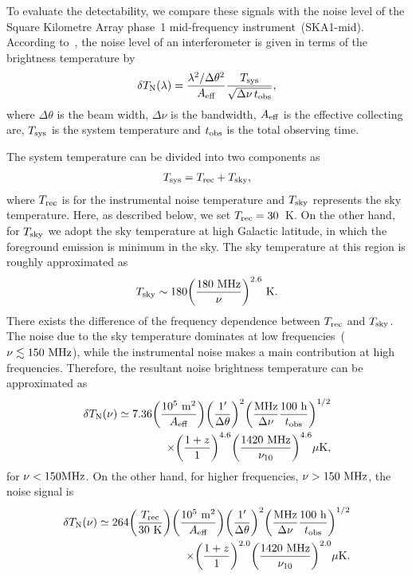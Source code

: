 \documentclass[a4paper,fleqn,usenatbib,useAMS]{mnras}
\begin{document}
To evaluate the detectability, we compare these signals with the noise level of the Square Kilometre Array phase~1 mid-frequency instrument~(SKA1-mid).
According to~\citet{Furlanetto2006}, the noise level of an
interferometer is given in terms of the brightness temperature by
\begin{align}
\delta T_{\rm{N}}(\lambda)=
 \frac{\lambda^{2}/\Delta
 \theta^{2}}{A_{\rm{eff}}}\frac{T_{\rm{sys}}}{\sqrt{\Delta \nu \,
 t_{\rm{obs}}}}, \label{eq:noise_eq}
\end{align}
where $\Delta \theta$ is the beam width, $\Delta \nu$ is the bandwidth,
$A_{\rm{eff}}$ is the effective collecting are, $T_{\rm sys}$ is the
system temperature and $t_{\rm obs}$ is the total observing time.

The system temperature can be divided into two components as
\begin{align}
T_{\rm{sys}} = T_{\rm{rec}} +T_{\rm{sky}},
\end{align}
where $T_{\rm rec}$ is for
the instrumental noise temperature and $T_{\rm{sky}}$ represents the sky temperature.
Here, as described below, we set $T_{\rm rec} =30$~K.
On the other hand, for $T_{\rm sky}$
we adopt the sky temperature at high Galactic latitude, in  which the
foreground emission is minimum in the sky.
The sky temperature at this region is roughly approximated as
\begin{align}
T_{\rm{sky}}\sim 180\biggl(\frac{180~\rm{MHz}}{\nu}\biggl)^{2.6}~\rm{K} .
\end{align}
There exists the difference of the frequency dependence
between $T_{\rm rec}$ and $T_{\rm sky}$. 
The noise due to the sky temperature 
dominates at low frequencies~($\nu \lesssim 150~\rm{MHz}$),
while the instrumental noise makes a main contribution at high
frequencies.
Therefore, the resultant noise brightness temperature 
can be approximated as 
\begin{align}
\delta T_{\rm{N}}(\nu)\simeq
 {7.36}
 \biggl( \frac{10^{5}~\rm{m}^{2}}{A_{\rm{eff}}} \biggl) \biggl(
 \frac{1'}{\Delta \theta} \biggl)^{2}
 \biggl( \frac{\rm{MHz}}{\Delta \nu} \frac{100~\rm{h}}{t_{\rm{obs}}}\biggl)^{1/2}
 \nonumber \\
 \quad \times \biggl( \frac{1+z}{1} \biggl)^{4.6} \biggl( \frac{1420~\rm{MHz}}{\nu_{10}} \biggl)^{4.6}
 \mu \rm{K}, 
\end{align}
for $\nu < 150\rm{MHz}$.
On the other hand, for higher frequencies, $\nu > 150~\rm{MHz}$, the noise
signal is 
\begin{align}
\delta T_{\rm{N}}(\nu)\simeq
{264}
 \biggl( \frac{T_{\rm{rec}}}{30~\rm{K}} \biggl) \biggl(
 \frac{10^{5}~\rm{m}^{2}}{A_{\rm{eff}}} \biggl) \biggl( \frac{1'}{\Delta
 \theta} \biggl)^{2} 
 \biggl( \frac{\rm{MHz}}{\Delta \nu} \frac{100~\rm{h}}{t_{\rm{obs}}} \biggl)^{1/2}
 \nonumber  \\
\quad \times \biggl( \frac{1+z}{1} \biggl)^{2.0}
 \biggl( \frac{1420~\rm{MHz}}{\nu_{10}} \biggl)^{2.0}
\mu \rm{K}.
\end{align}
\end{document}
